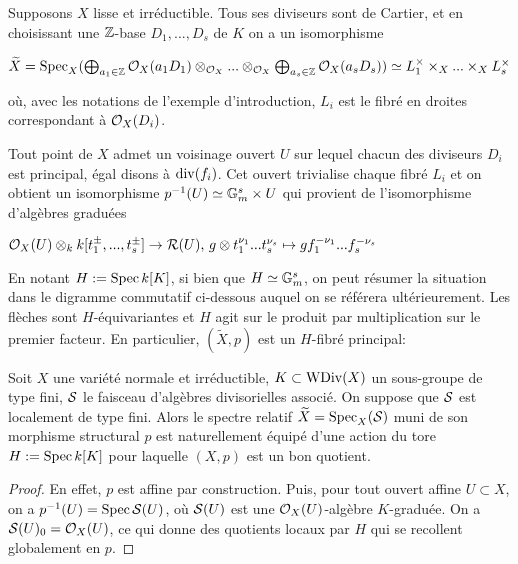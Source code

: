 \begin{rem}\label{lisseGoodQuotient}
Supposons $X$ lisse et irréductible. Tous ses diviseurs sont de Cartier, et en choisissant une $\mathbb{Z}$-base $D_1,...,D_s$ de $K$ on a un isomorphisme
\begin{center}
$\widetilde{X}=\operatorname{Spec}_X(\bigoplus_{a_1\in\mathbb{Z}}\mathcal{O}_X(a_1D_1)\otimes_{\mathcal{O}_X}...\otimes_{\mathcal{O}_X}\bigoplus_{a_s\in\mathbb{Z}}\mathcal{O}_X(a_sD_s))\simeq L_1^\times\times_X...\times_X L_s^\times$
\end{center}
où, avec les notations de l'exemple d'introduction, $L_i$ est le fibré en droites correspondant à $\mathcal{O}_X(D_i)$. 

Tout point de $X$ admet un voisinage ouvert $U$ sur lequel chacun des diviseurs $D_i$ est principal, égal disons à $\operatorname{div}(f_i)$. Cet ouvert trivialise chaque fibré $L_i$ et on obtient un isomorphisme $p^{-1}(U)\simeq \mathbb{G}_m^s\times U$ qui provient de l'isomorphisme d'algèbres graduées
\begin{center}
$\mathcal{O}_X(U)\otimes_k k[t_1^{\pm},...,t_s^{\pm}] \rightarrow \mathcal{R}(U),\, g\otimes t_1^{\nu_1}...t_s^{\nu_s}\mapsto gf_1^{-\nu_1}...f_s^{-\nu_s}$
\end{center}

En notant $H:=\operatorname{Spec} k[K]$, si bien que $H\simeq \mathbb{G}_m^s$, on peut résumer la situation dans le digramme commutatif ci-dessous auquel on se référera ultérieurement. Les flèches sont $H$-équivariantes et $H$ agit sur le produit par multiplication sur le premier facteur. En particulier, $(\widetilde{X},p)$ est un $H$-fibré principal:
\begin{center}
\end{center}
\end{rem}



\begin{cons}\label{specrelatifdivi}
Soit $X$ une variété normale et irréductible, $K\subset \operatorname{WDiv}(X)$ un sous-groupe de type fini, $\mathcal{S}$ le faisceau d'algèbres divisorielles associé. On suppose que $\mathcal{S}$ est localement de type fini. Alors le spectre relatif $\widetilde{X}=\operatorname{Spec}_X(\mathcal{S})$ muni de son morphisme structural $p$ est naturellement équipé d'une action du tore $H:=\operatorname{Spec} k[K]$ pour laquelle $(X,p)$ est un bon quotient.
\end{cons}
\begin{proof}
En effet, $p$ est affine par construction. Puis, pour tout ouvert affine $U\subset X$, on a $p^{-1}(U)=\operatorname{Spec} \mathcal{S}(U)$, où $\mathcal{S}(U)$ est une $\mathcal{O}_X(U)$-algèbre $K$-graduée. On a $\mathcal{S}(U)_0=\mathcal{O}_X(U)$, ce qui donne des quotients locaux par $H$ qui se recollent globalement en $p$.
\end{proof}

